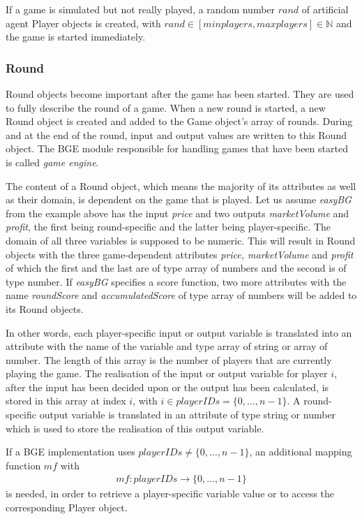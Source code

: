 If a game is simulated but not really played, a random number $rand$ of artificial agent Player objects is created, with $rand \in [minplayers, maxplayers] \in \mathbb{N}$ and the game is started immediately. 

\subsubsection{Round}
\label{subsub:round}

Round objects become important after the game has been started. They are used to fully describe the round of a game. When a new round is started, a new Round object is created and added to the Game object's array of rounds. During and at the end of the round, input and output values are written to this Round object. The BGE module responsible for handling games that have been started is called \textit{game engine}.

The content of a Round object, which means the majority of its attributes as well as their domain, is dependent on the game that is played. Let us assume \textit{easyBG} from the example above has the input \textit{price} and two outputs \textit{marketVolume} and \textit{profit}, the first being round-specific and the latter being player-specific. The domain of all three variables is supposed to be numeric. This will result in Round objects with the three game-dependent attributes \textit{price, marketVolume} and \textit{profit} of which the first and the last are of type array of numbers and the second is of type number. If \textit{easyBG} specifies a score function, two more attributes with the name  \textit{roundScore} and \textit{accumulatedScore} of type array of numbers will be added to its Round objects. 

In other words, each player-specific input or output variable is translated into an attribute with the name of the variable and type array of string or array of number. The length of this array is the number of players that are currently playing the game. The realisation of the input or output variable for player $i$, after the input has been decided upon or the output has been calculated, is stored in this array at index $i$, with $i \in playerIDs = \{0,\dots, n-1\}$. A round-specific output variable is translated in an attribute of type string or number which is used to store the realisation of this output variable.

If a BGE implementation uses $playerIDs \neq \{0,\dots, n-1\}$, an additional mapping function $mf$ with
\begin{align}
mf \colon playerIDs \to \{0,\dots, n-1\}
\end{align}
is needed, in order to retrieve a player-specific variable value or to access the corresponding Player object.

